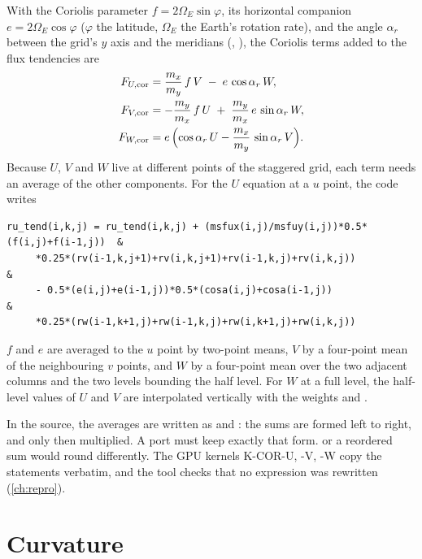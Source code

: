 With the Coriolis parameter $f = 2\Omega_E\sin\varphi$, its horizontal companion $e = 2\Omega_E\cos\varphi$
($\varphi$ the latitude, $\Omega_E$ the Earth's rotation rate), and the angle $\alpha_r$ between the grid's $y$ axis
and the meridians (, ), the Coriolis terms added to the flux tendencies are
\begin{align}
  F_{U,\mathrm{cor}} &= \frac{m_x}{m_y}\,f\,V \;-\; e\,\cos\alpha_r\,W, \notag\\
  F_{V,\mathrm{cor}} &= -\frac{m_y}{m_x}\,f\,U \;+\; \frac{m_y}{m_x}\,e\,\sin\alpha_r\,W, \label{eq:coriolis}\\
  F_{W,\mathrm{cor}} &= e\,\Bigl(\cos\alpha_r\,U - \frac{m_x}{m_y}\,\sin\alpha_r\,V\Bigr). \notag
\end{align}
Because $U$, $V$ and $W$ live at different points of the staggered grid, each term needs an average of the other
components. For the $U$ equation at a $u$ point, the code writes
\begin{lstlisting}
ru_tend(i,k,j) = ru_tend(i,k,j) + (msfux(i,j)/msfuy(i,j))*0.5*(f(i,j)+f(i-1,j))  &
     *0.25*(rv(i-1,k,j+1)+rv(i,k,j+1)+rv(i-1,k,j)+rv(i,k,j))                     &
     - 0.5*(e(i,j)+e(i-1,j))*0.5*(cosa(i,j)+cosa(i-1,j))                          &
     *0.25*(rw(i-1,k+1,j)+rw(i-1,k,j)+rw(i,k+1,j)+rw(i,k,j))
\end{lstlisting}
$f$ and $e$ are averaged to the $u$ point by two-point means, $V$ by a four-point mean of the neighbouring $v$
points, and $W$ by a four-point mean over the two adjacent columns and the two levels bounding the half level. For $W$
at a full level, the half-level values of $U$ and $V$ are interpolated vertically with the weights  and
.

\begin{portnote}
In the source, the averages are written as  and : the sums are formed left to
right, and only then multiplied. A port must keep exactly that form.  or a reordered sum would
round differently. The GPU kernels K-COR-U, -V, -W copy the statements verbatim, and the tool 
checks that no expression was rewritten (\cref{ch:repro}).
\end{portnote}

\section{Curvature}

